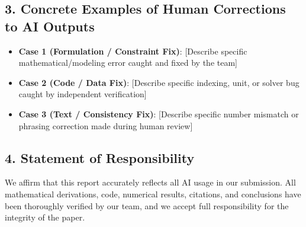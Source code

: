 \subsection*{3. Concrete Examples of Human Corrections to AI Outputs}
\begin{itemize}
  \item \textbf{Case 1 (Formulation / Constraint Fix)}: [Describe specific mathematical/modeling error caught and fixed by the team]
  \item \textbf{Case 2 (Code / Data Fix)}: [Describe specific indexing, unit, or solver bug caught by independent verification]
  \item \textbf{Case 3 (Text / Consistency Fix)}: [Describe specific number mismatch or phrasing correction made during human review]
\end{itemize}

\subsection*{4. Statement of Responsibility}
We affirm that this report accurately reflects all AI usage in our submission. All mathematical derivations, code, numerical results, citations, and conclusions have been thoroughly verified by our team, and we accept full responsibility for the integrity of the paper.
